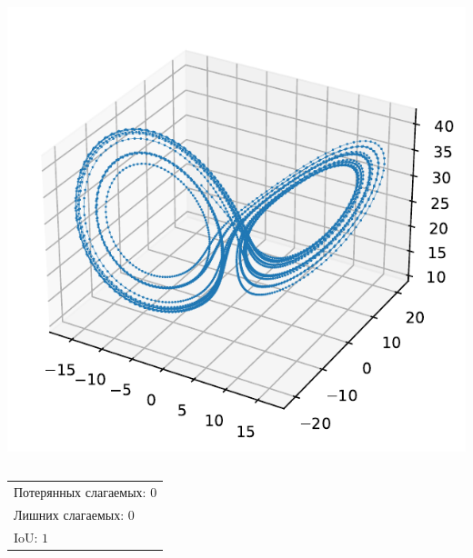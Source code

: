 \documentclass[pdf, hyperref={unicode}, aspectratio=169]{beamer}
\begin{document}
\begin{frame}
\begin{onlyenv}
\begin{columns}
  \includegraphics[height=\linewidth]{img/ex2_res}
\end{columns}
\vfill
\begin{center}
  \begin{tabular}{l}
  Потерянных слагаемых: $0$\\
  Лишних слагаемых: $0$\\
  IoU: $1$\\
  \end{tabular}
\end{center}
\end{onlyenv}


\end{frame}
\end{document}

